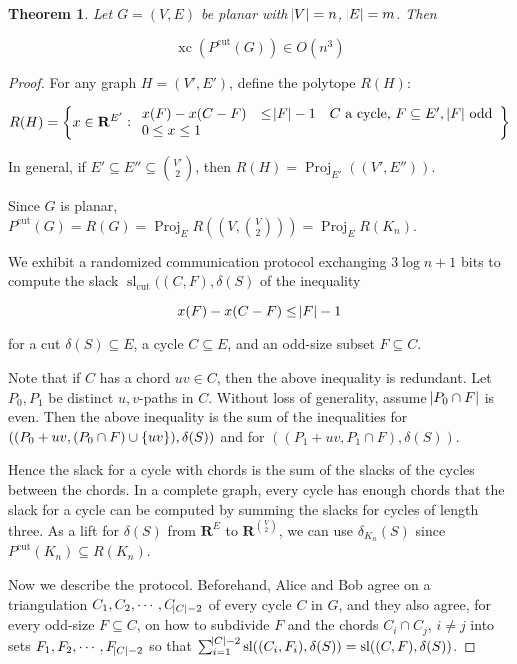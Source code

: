 \documentclass{article}
\newtheorem{theorem}{Theorem}
\DeclareMathOperator{\xc}{xc}
\DeclareMathOperator{\proj}{Proj}
\DeclareMathOperator{\Sl}{sl}
\begin{document}
\begin{theorem}
Let $G=(V,E)$ be planar with $\abs{V}=n$, $\abs{E}=m$. Then 

$$\xc(P^{\text{cut}}(G)) \in O(n^3)$$
\end{theorem}
\begin{proof}
For any graph $H=(V', E')$, define the polytope $R(H)$:

$$R(H) = \cbr{x\in \mathbf{R}^{E'}: \begin{array}{lll} x(F) - x(C-F) & \leq \abs{F} - 1 & \text{$C$ a cycle, $F\subseteq E'$, $\abs{F}$ odd} \\ 0 \leq x \leq 1 \end{array}}$$

In general, if $E' \subseteq E'' \subseteq {V'\choose 2}$, then
$R(H) = \proj_{E'}((V', E''))$.

Since $G$ is planar, $P^{\text{cut}}(G) = R(G) = \proj_{E} R((V, {V\choose 2}))=\proj_{E} R(K_n)$.

We exhibit a randomized communication protocol exchanging $3\log n + 1$ bits
to compute the slack $\Sl_{\text{cut}}((C,F), \delta(S)$ of
the inequality

$$x(F) - x(C-F)\leq \abs{F}-1$$

for a cut $\delta(S)\subseteq E$, a cycle $C\subseteq E$, and an odd-size
subset $F\subseteq C$.

Note that if $C$ has a chord $uv\in C$, then the above inequality is redundant.
Let $P_0, P_1$ be distinct $u,v$-paths in  $C$. Without loss
of generality, assume $\abs{P_0\cap F}$ is even. Then the above inequality
is the sum of the inequalities for $((P_0 + uv, (P_0 \cap F)\cup\cbr{uv}), \delta(S))$
and for $((P_1 + uv, P_1\cap F), \delta(S))$.

Hence the slack for a cycle with chords is the sum of the slacks of the cycles
between the chords. In a complete graph, every cycle has enough chords
that the slack for a cycle can be computed by summing the slacks for
cycles of length three. As a lift for $\delta(S)$ 
from $\mathbf{R}^E$ to $\mathbf{R}^{{V\choose 2}}$,
we can use $\delta_{K_n}(S)$ since $P^{\text{cut}}(K_n) \subseteq R(K_n)$.

Now we describe the protocol. Beforehand, Alice and Bob agree
on a triangulation $C_1, C_2, \cdots, C_{\abs{C}-2}$ of every cycle $C$ in $G$,
and they also agree, for every odd-size $F\subseteq C$, on how to subdivide
$F$ and the chords $C_i\cap C_j$, $i\neq j$ into sets 
$F_1, F_2,\cdots, F_{\abs{C}-2}$ so that $\sum_{i=1}^{\abs{C}-2} \Sl((C_i, F_i),\delta(S)) = \Sl((C, F), \delta(S))$.


\end{proof}
\end{document}
